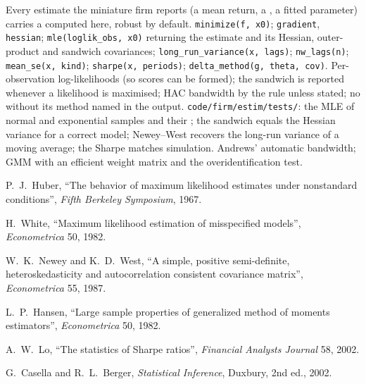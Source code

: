 \begin{build}
 Every estimate the miniature firm reports (a mean return, a , a fitted parameter) carries a
 computed here, robust by default.
 \texttt{minimize(f, x0)}; \texttt{gradient}, \texttt{hessian}; \texttt{mle(loglik\_obs, x0)} returning the
estimate and its Hessian, outer-product and sandwich covariances; \texttt{long\_run\_variance(x, lags)}; \texttt{nw\_lags(n)};
\texttt{mean\_se(x, kind)}; \texttt{sharpe(x, periods)}; \texttt{delta\_method(g, theta, cov)}.
 Per-observation log-likelihoods (so scores can be formed); the sandwich is reported whenever a likelihood is
maximised; HAC bandwidth by the rule unless stated; no  without its method named in the output.
 \texttt{code/firm/estim/tests/}: the MLE of normal and exponential samples and their ;
the sandwich equals the Hessian variance for a correct model; Newey--West recovers the long-run variance of a moving average;
the Sharpe  matches simulation.
 Andrews' automatic bandwidth; GMM with an efficient weight matrix and the overidentification test.
\end{build}

\begin{omsources}
\item P.~J.~Huber, ``The behavior of maximum likelihood estimates under nonstandard conditions'', \emph{Fifth Berkeley
Symposium}, 1967.
\item H.~White, ``Maximum likelihood estimation of misspecified models'', \emph{Econometrica} 50, 1982.
\item W.~K.~Newey and K.~D.~West, ``A simple, positive semi-definite, heteroskedasticity and autocorrelation consistent covariance
matrix'', \emph{Econometrica} 55, 1987.
\item L.~P.~Hansen, ``Large sample properties of generalized method of moments estimators'', \emph{Econometrica} 50, 1982.
\item A.~W.~Lo, ``The statistics of Sharpe ratios'', \emph{Financial Analysts Journal} 58, 2002.
\item G.~Casella and R.~L.~Berger, \emph{Statistical Inference}, Duxbury, 2nd ed., 2002.
\end{omsources}

